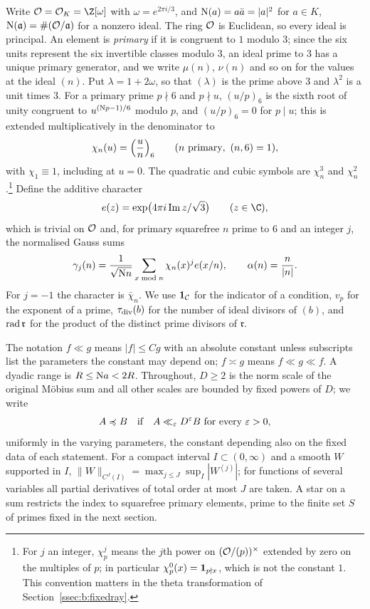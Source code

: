 Write $\OO=\OO_K=\Z[\omega]$ with $\omega=e^{2\pi i/3}$, and $\mathrm{N}(a)=a\bar a=|a|^2$ for $a\in K$, $\mathrm{N}(\mathfrak a)=\#(\mathcal{O}/\mathfrak a)$ for a nonzero ideal. The ring $\mathcal{O}$ is Euclidean, so every ideal is principal. An element is \emph{primary} if it is congruent to $1$ modulo $3$; since the six units represent the six invertible classes modulo $3$, an ideal prime to $3$ has a unique primary generator, and we write $\mu(n)$, $\nu(n)$ and so on for the values at the ideal $(n)$. Put $\lambda=1+2\omega$, so that $(\lambda)$ is the prime above $3$ and $\lambda^2$ is a unit times $3$. For a primary prime $p\nmid6$ and $p\nmid u$, $(u/p)_6$ is the sixth root of unity congruent to $u^{(\mathrm{N} p-1)/6}$ modulo $p$, and $(u/p)_6=0$ for $p\mid u$; this is extended multiplicatively in the denominator to
\[
  \chi_n(u)=\Bigl(\frac un\Bigr)_6\qquad(n\text{ primary},\ (n,6)=1),
\]
with $\chi_1\equiv1$, including at $u=0$. The quadratic and cubic symbols are $\chi_n^3$ and $\chi_n^2$.\footnote{For $j$ an integer, $\chi_p^j$ means the $j$th power on $(\mathcal{O}/(p))^\times$ extended by zero on the multiples of $p$; in particular $\chi_p^0(x)=\mathbf{1}_{p\nmid x}$, which is not the constant $1$. This convention matters in the theta transformation of Section~\ref{ssec:b:fixedray}.} Define the additive character
\[
  e(z)=\exp\bigl(4\pi i\operatorname{Im}z/\sqrt3\bigr)\qquad(z\in\C),
\]
which is trivial on $\mathcal{O}$ and, for primary squarefree $n$ prime to $6$ and an integer $j$, the normalised Gauss sums
\begin{equation}\label{eq:b:gauss}
  \gamma_j(n)=\frac1{\sqrt{\mathrm{N} n}}\sum_{x\bmod n}\chi_n(x)^je(x/n),\qquad
  \alpha(n)=\frac n{|n|}.
\end{equation}
For $j=-1$ the character is $\bar\chi_n$. We use $\mathbf{1}_{\mathcal C}$ for the indicator of a condition, $v_p$ for the exponent of a prime, $\tau_{\rm div}(b)$ for the number of ideal divisors of $(b)$, and $\operatorname{rad}\mathfrak r$ for the product of the distinct prime divisors of $\mathfrak r$.

The notation $f\ll g$ means $|f|\le Cg$ with an absolute constant unless subscripts list the parameters the constant may depend on; $f\asymp g$ means $f\ll g\ll f$. A dyadic range is $R\le\mathrm{N} a<2R$. Throughout, $D\ge2$ is the norm scale of the original M\"obius sum and all other scales are bounded by fixed powers of $D$; we write
\[
  A\preccurlyeq B\quad\text{if}\quad A\ll_\varepsilon D^\varepsilon B\ \text{for every }\varepsilon>0,
\]
uniformly in the varying parameters, the constant depending also on the fixed data of each statement. For a compact interval $I\subset(0,\infty)$ and a smooth $W$ supported in $I$, $\|W\|_{C^J(I)}=\max_{j\le J}\sup_I|W^{(j)}|$; for functions of several variables all partial derivatives of total order at most $J$ are taken. A star on a sum restricts the index to squarefree primary elements, prime to the finite set $S$ of primes fixed in the next section.

